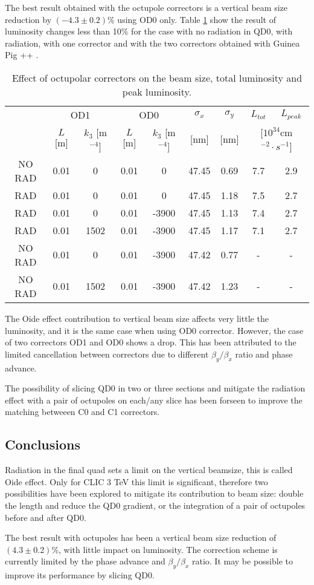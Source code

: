 The best result obtained with the octupole correctors is a vertical beam size reduction by $(-4.3\pm0.2)$\% using OD0 only. Table \ref{t:correctors} show the result of luminosity changes less than 10\% for the case with no radiation in QD0, with radiation, with one corrector and with the two correctors obtained with Guinea Pig ++ \cite{Schulte:382453}.\par
\begin{table}[!hbt]
\centering
\scriptsize
\begin{tabular}{c||c|c|c|c||c|c||c|c}\hline
& \multicolumn{2}{c|}{OD1} &\multicolumn{2}{c||}{OD0} & $\sigma_x$ & $\sigma_y$ & $L_{tot}$ & $L_{peak}$\\
& $L$ [m] & $k_3$ [m$^{-4}$] & $L$ [m] & $k_3$ [m$^{-4}$] &  [nm] & [nm] & \multicolumn{2}{c}{[$10^{34}$cm$^{-2}\cdot s^{-1}$]}\\\hline\hline
NO RAD & 0.01 & 0 & 0.01 & 0 & 47.45 & 0.69 & 7.7 & 2.9\\
RAD    & 0.01 & 0 & 0.01 & 0 & 47.45 & 1.18 & 7.5 & 2.7 \\
RAD    & 0.01 & 0 & 0.01 & -3900 & 47.45 & 1.13 & 7.4 & 2.7 \\
RAD    & 0.01 & 1502 & 0.01 & -3900 & 47.45 & 1.17 & 7.1 & 2.7 \\\hline
NO RAD & 0.01 & 0 & 0.01 & -3900 & 47.42 & 0.77 & - & -\\
NO RAD & 0.01 & 1502 & 0.01 & -3900 & 47.42 & 1.23 & - & -\\\hline
\end{tabular}\caption{Effect of octupolar correctors on the beam size, total luminosity and peak luminosity.}\label{t:correctors}
\end{table}
The Oide effect contribution to vertical beam size affects very little the luminosity, and it is the same case when using OD0 corrector. However, the case of two correctors OD1 and OD0 shows a drop. This has been attributed to the limited cancellation between correctors due to different $\beta_y/\beta_x$ ratio and phase advance.\par
The possibility of slicing QD0 in two or three sections and mitigate the radiation effect with a pair of octupoles on each/any slice has been forseen to improve the matching betweeen C0 and C1 correctors.\par
\subsection{Conclusions}
Radiation in the final quad sets a limit on the vertical beamsize, this is called Oide effect. Only for CLIC 3 TeV this limit is significant, therefore two possibilities have been explored to mitigate its contribution to beam size: double the length and reduce the QD0 gradient, or the integration of a pair of octupoles before and after QD0.\par
The best result with octupoles has been a vertical beam size reduction of $(4.3\pm0.2)$\%, with little impact on luminosity. The correction scheme is currently limited by the phase advance and $\beta_y/\beta_x$ ratio. It may be possible to improve its performance by slicing QD0.\par
